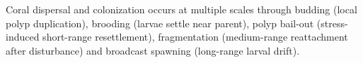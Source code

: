 






Coral dispersal and colonization occurs at multiple scales through budding (local polyp duplication), brooding (larvae settle near parent), polyp bail-out (stress-induced short-range resettlement), fragmentation (medium-range reattachment after disturbance) and broadcast spawning (long-range larval drift).


